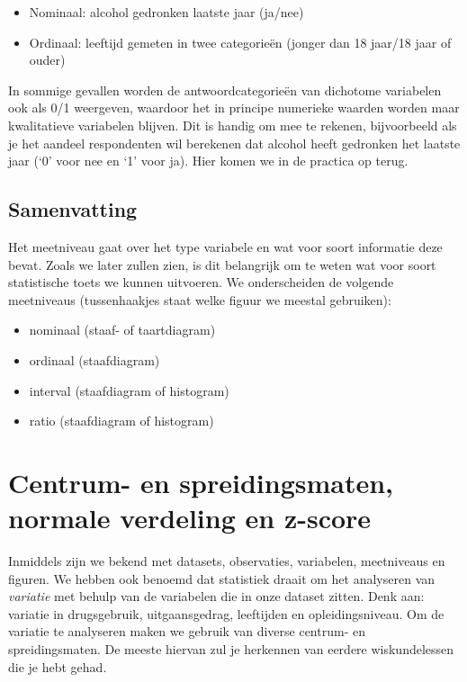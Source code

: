 \documentclass[
  letterpaper,
  DIV=11,
  numbers=noendperiod]{scrreprt}
\providecommand{\tightlist}{%
  \setlength{\itemsep}{0pt}\setlength{\parskip}{0pt}}
\begin{document}
\begin{itemize}
\tightlist
\item
  Nominaal: alcohol gedronken laatste jaar (ja/nee)
\item
  Ordinaal: leeftijd gemeten in twee categorieën (jonger dan 18 jaar/18
  jaar of ouder)
\end{itemize}

In sommige gevallen worden de antwoordcategorieën van dichotome
variabelen ook als 0/1 weergeven, waardoor het in principe numerieke
waarden worden maar kwalitatieve variabelen blijven. Dit is handig om
mee te rekenen, bijvoorbeeld als je het aandeel respondenten wil
berekenen dat alcohol heeft gedronken het laatste jaar (`0' voor nee en
`1' voor ja). Hier komen we in de practica op terug.

\section{Samenvatting}\label{samenvatting}

Het meetniveau gaat over het type variabele en wat voor soort informatie
deze bevat. Zoals we later zullen zien, is dit belangrijk om te weten
wat voor soort statistische toets we kunnen uitvoeren. We onderscheiden
de volgende meetniveaus (tussenhaakjes staat welke figuur we meestal
gebruiken):

\begin{itemize}
\tightlist
\item
  nominaal (staaf- of taartdiagram)
\item
  ordinaal (staafdiagram)
\item
  interval (staafdiagram of histogram)
\item
  ratio (staafdiagram of histogram)
\end{itemize}

\chapter{Centrum- en spreidingsmaten, normale verdeling en
z-score}\label{centrum--en-spreidingsmaten-normale-verdeling-en-z-score}

Inmiddels zijn we bekend met datasets, observaties, variabelen,
meetniveaus en figuren. We hebben ook benoemd dat statistiek draait om
het analyseren van \emph{variatie} met behulp van de variabelen die in
onze dataset zitten. Denk aan: variatie in drugsgebruik, uitgaansgedrag,
leeftijden en opleidingsniveau. Om de variatie te analyseren maken we
gebruik van diverse centrum- en spreidingsmaten. De meeste hiervan zul
je herkennen van eerdere wiskundelessen die je hebt gehad.
\end{document}
